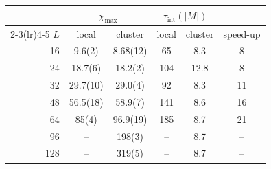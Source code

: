 \begin{tabular}{rccccc}
\toprule
& \multicolumn{2}{c}{$\chi_\text{max}$} & \multicolumn{2}{c}{$\tau_\text{int}(|M|)$} & \\
\cmidrule(lr){2-3}\cmidrule(lr){4-5}
$L$ & local & cluster & local & cluster & speed-up \\
\midrule
16 & 9.6(2) & 8.68(12) & 65 & 8.3 & 8 \\
24 & 18.7(6) & 18.2(2) & 104 & 12.8 & 8 \\
32 & 29.7(10) & 29.0(4) & 92 & 8.3 & 11 \\
48 & 56.5(18) & 58.9(7) & 141 & 8.6 & 16 \\
64 & 85(4) & 96.9(19) & 185 & 8.7 & 21 \\
96 & -- & 198(3) & -- & 8.7 & -- \\
128 & -- & 319(5) & -- & 8.7 & -- \\
\bottomrule
\end{tabular}
